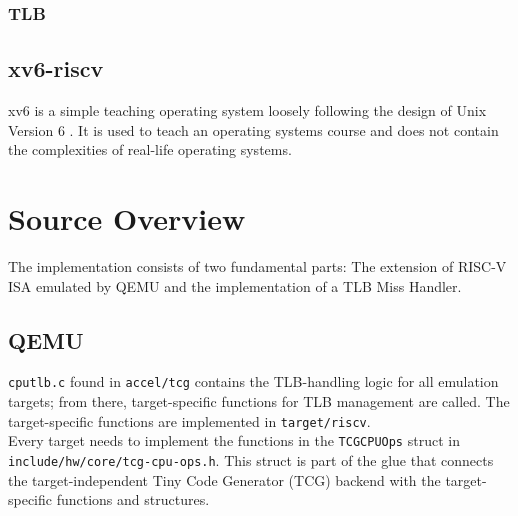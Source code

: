 \subsubsection{TLB}





\subsection{xv6-riscv}
xv6 is a simple teaching operating system loosely following the design of Unix Version 6 \cite{cox2011xv6}.
It is used to teach an operating systems course and does not contain the complexities of real-life
operating systems.

\section{Source Overview}
The implementation consists of two fundamental parts:
The extension of RISC-V ISA emulated by QEMU and the implementation of a
TLB Miss Handler.


\subsection{QEMU}
\texttt{cputlb.c} found in \texttt{accel/tcg} contains the TLB-handling logic for all
emulation targets; from there, target-specific functions for TLB management are called.
The target-specific functions are implemented in \texttt{target/riscv}.\\
Every target needs to implement the functions in the \texttt{TCGCPUOps} struct in
\texttt{include/hw/core/tcg-cpu-ops.h}. This struct is part of the glue that connects the target-independent
Tiny Code Generator (TCG) backend with the target-specific functions and structures.

